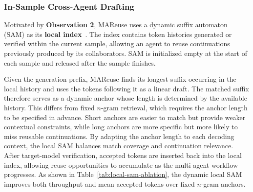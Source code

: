 \documentclass[letterpaper]{article} %
\begin{document}
\subsubsection{In-Sample Cross-Agent Drafting}
Motivated by \textbf{Observation 2}, MAReuse uses a dynamic suffix automaton (SAM) as its \textbf{local index}~\citep{DBLP:journals/tcs/BlumerBHECS85}. The index contains token histories generated or verified within the current sample, allowing an agent to reuse continuations previously produced by its collaborators. SAM is initialized empty at the start of each sample and released after the sample finishes.




Given the generation prefix, MAReuse finds its longest suffix occurring in the local history and uses the tokens following it as a linear draft. The matched suffix therefore serves as a dynamic anchor whose length is determined by the available history.
This differs from fixed $n$-gram retrieval, which requires the anchor length to be specified in advance. Short anchors are easier to match but provide weaker contextual constraints, while long anchors are more specific but more likely to miss reusable continuations. By adapting the anchor length to each decoding context, the local SAM balances match coverage and continuation relevance.
After target-model verification, accepted tokens are inserted back into the local index, allowing reuse opportunities to accumulate as the multi-agent workflow progresses. As shown in Table~\ref{tab:local-sam-ablation}, the dynamic local SAM improves both throughput and mean accepted tokens over fixed $n$-gram anchors.




\end{document}

